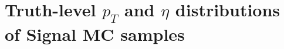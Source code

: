 \section{Truth-level \texorpdfstring{$p_{T}$}{pt} and \texorpdfstring{$\eta$}{eta} distributions of Signal MC samples}
\label{app:signal_truth}

